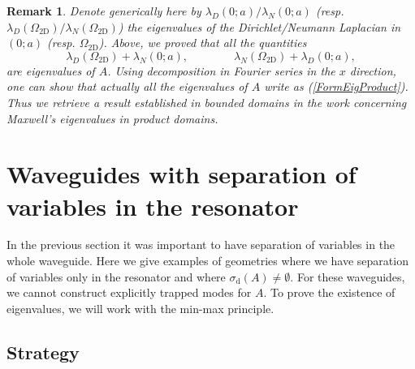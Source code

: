 \documentclass[11pt,a4paper]{article}
\newcommand{\Om}{\Omega}
\newcommand{\mrm}[1]{\mathrm{#1}}
\newtheorem{remark}[theorem]{Remark}
\begin{document}
\begin{remark}\label{RmkFourierSeries}
Denote generically here by $\lambda_D(0;a)/\lambda_N(0;a)$ (resp. $\lambda_D(\Om_{\mrm{2D}})/\lambda_N(\Om_{\mrm{2D}})$) the eigenvalues of the Dirichlet/Neumann Laplacian in $(0;a)$ (resp. $\Om_{\mrm{2D}}$). Above, we proved that all the quantities 
\begin{equation}\label{FormEigProduct}
\lambda_D(\Om_{\mrm{2D}})+\lambda_N(0;a),\qquad\qquad\lambda_N(\Om_{\mrm{2D}})+\lambda_D(0;a),
\end{equation}
are eigenvalues of $A$. Using decomposition in Fourier series in the $x$ direction, one can show that actually all the eigenvalues of $A$ write as (\ref{FormEigProduct}). Thus we retrieve a result established in bounded domains in the work \cite{zbMATH07224760} concerning Maxwell's eigenvalues in product domains.
\end{remark}

\section{Waveguides with separation of variables in the resonator}\label{Section1}

In the previous section it was important to have separation of variables in the whole waveguide. Here we give examples of geometries where we have separation of variables only in the resonator and where $\sigma_{\mrm{d}}(A)\ne\emptyset$. For these waveguides, we cannot construct explicitly trapped modes for $A$. To prove the existence of eigenvalues, we will work with the min-max principle.




\subsection{Strategy}\label{paraStrategy}
\end{document}
